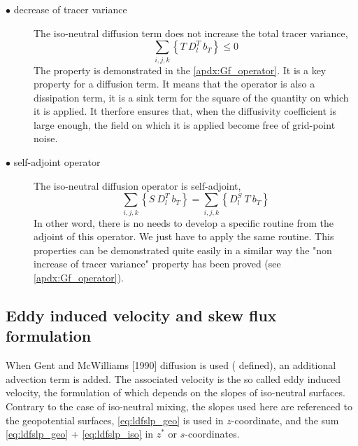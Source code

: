 \documentclass[../main/NEMO_manual]{subfiles}
\begin{document}
\begin{description}
\item[$\bullet$ decrease of tracer variance]
  The iso-neutral diffusion term does not increase the total tracer variance, \ie
  \[
    \sum_{i,j,k} \left\{ T \ D_l^T \ b_T \right\} \leq 0
  \]
The property is demonstrated in the \autoref{apdx:Gf_operator}.
It is a key property for a diffusion term.
It means that the operator is also a dissipation term,
\ie it is a sink term for the square of the quantity on which it is applied.
It therfore ensures that, when the diffusivity coefficient is large enough,
the field on which it is applied become free of grid-point noise.

\item[$\bullet$ self-adjoint operator]
  The iso-neutral diffusion operator is self-adjoint, \ie
  \[
    \sum_{i,j,k} \left\{ S \ D_l^T \ b_T \right\} = \sum_{i,j,k} \left\{ D_l^S \ T \ b_T \right\}
  \]
In other word, there is no needs to develop a specific routine from the adjoint of this operator.
We just have to apply the same routine.
This properties can be demonstrated quite easily in a similar way the "non increase of tracer variance" property
has been proved (see \autoref{apdx:Gf_operator}).
\end{description}

\subsection{Eddy induced velocity and skew flux formulation}

When Gent and McWilliams [1990] diffusion is used ( defined),
an additional advection term is added.
The associated velocity is the so called eddy induced velocity,
the formulation of which depends on the slopes of iso-neutral surfaces.
Contrary to the case of iso-neutral mixing, the slopes used here are referenced to the geopotential surfaces,
\ie \autoref{eq:ldfslp_geo} is used in $z$-coordinate,
and the sum \autoref{eq:ldfslp_geo} + \autoref{eq:ldfslp_iso} in $z^*$ or $s$-coordinates. 
\end{document}
